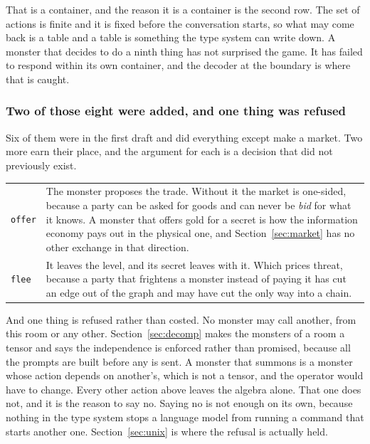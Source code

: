 \documentclass[11pt,a4paper]{article}
\begin{document}
That is a container, and the reason it is a container is the second row. The set of actions is
finite and it is fixed before the conversation starts, so what may come back is a table and a
table is something the type system can write down. A monster that decides to do a ninth thing has
not surprised the game. It has failed to respond within its own container, and the decoder at the
boundary is where that is caught.

\subsubsection*{Two of those eight were added, and one thing was refused}

Six of them were in the first draft and did everything except make a market. Two more earn their
place, and the argument for each is a decision that did not previously exist.

\begin{center}
\begin{tabular}{@{}l@{\hspace{5mm}}>{\raggedright\arraybackslash}p{}@{}}
\toprule
\texttt{offer} & The monster proposes the trade. Without it the market is one-sided, because a
party can be asked for goods and can never be \emph{bid} for what it knows. A monster that offers
gold for a secret is how the information economy pays out in the physical one, and
Section~\ref{sec:market} has no other exchange in that direction. \\[1mm]
\texttt{flee}  & It leaves the level, and its secret leaves with it. Which prices threat, because
a party that frightens a monster instead of paying it has cut an edge out of the graph and may
have cut the only way into a chain. \\
\bottomrule
\end{tabular}
\end{center}

\begin{alarmbox}
And one thing is refused rather than costed. No monster may call another, from this room or any
other. Section~\ref{sec:decomp} makes the monsters of a room a tensor and says the independence is
enforced rather than promised, because all the prompts are built before any is sent. A monster
that summons is a monster whose action depends on another's, which is not a tensor, and the
operator would have to change. Every other action above leaves the algebra alone. That one does
not, and it is the reason to say no. Saying no is not enough on its own, because nothing in the
type system stops a language model from running a command that starts another one.
Section~\ref{sec:unix} is where the refusal is actually held.
\end{alarmbox}
\end{document}
